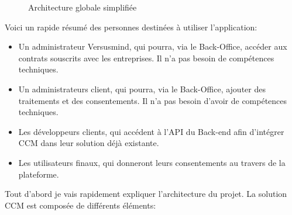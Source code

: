 \documentclass[12pt, a4paper]{report}
\begin{document}
\begin{figure}[H]
\begin{center}
    \end{center}
    \caption{Architecture globale simplifiée}
\end{figure}
Voici un rapide résumé des personnes destinées à utiliser l'application:
\begin{itemize}
    \item Un administrateur Versusmind, qui pourra, via le Back-Office, accéder aux contrats souscrits avec les entreprises. Il n'a pas besoin de compétences techniques.
    \item Un administrateurs client, qui pourra, via le Back-Office, ajouter des traitements et des consentements. Il n'a pas besoin d'avoir de compétences techniques.
    \item Les développeurs clients, qui accédent à l'API du Back-end afin d'intégrer CCM dans leur solution déjà existante.
    \item Les utilisateurs finaux, qui donneront leurs consentements au travers de la plateforme.
\end{itemize}
Tout d'abord je vais rapidement expliquer l'architecture du projet.
La solution CCM est composée de différents éléments:
\end{document}
